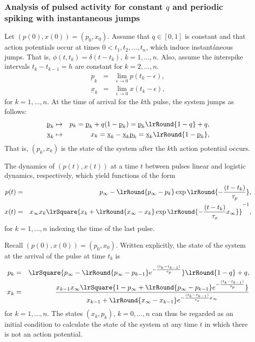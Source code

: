 \documentclass[8pt]{beamer}
\begin{document}
\begin{frame}
\frametitle{Analysis of pulsed activity for constant $q$ and periodic
  spiking with instantaneous jumps}

\begin{multicols}{2}
\begin{tiny}

  Let $(p(0),x(0))=(p_0,x_0)$.  Assume that $q \in [0,1]$ is constant
  and that action potentials occur at times $0<t_1, t_2,...,t_n$,
  which induce instantáneous jumps. That is, $\phi(t,t_k) =
  \delta(t-t_k)$, $k=1,...,n$.  Also, assume the interspike intervals
  $t_k - t_{k-1}=h$ are constant for $k=2,...,n$.
\begin{eqnarray}
\underbar{p}_k&=& \lim_{\epsilon\rightarrow 0} p(t_k-\epsilon), 
\\
\underbar{x}_k&=& \lim_{\epsilon\rightarrow 0} x(t_k-\epsilon),
\end{eqnarray}
for $k=1,...,n$. 
At the time of arrival for the $k$th pulse, the system jumps as follows:
\begin{eqnarray}
\underbar{p}_k& \mapsto & p_k= \underbar{p}_k + q (1-\underbar{p}_k) = \underbar{p}_k \lrRound{1-q} + q,
\\
\underbar{x}_k& \mapsto &
x_k
= \underbar{x}_k - \underbar{x}_k \underbar{p}_k 
= \underbar{x}_k \lrRound{1-\underbar{p}_k} ,
\end{eqnarray}
That is, $(p_k,x_k)$ is the state of the system after the $k$th
action potential occurs. 

The dynamics of $(p(t),x(t))$ at a time $t$ between pulses
linear and logistic dynamics, respectively, which yield functions of the form
\begin{eqnarray}
p(t) &=& p_{\infty} - \lrRound{p_{\infty}- p_k}
   \exp\lrRound{-\frac{(t-t_k)}{\tau_p}},
 \\
x(t) &=& x_{\infty} {x_k} \lrSquare{{x_k} + \lrRound{x_{\infty}- x_k}
\exp\lrRound{-\frac{(t-t_k)}{\tau_x}x_{\infty} }}^{-1},
\end{eqnarray}
for $k=1,...,n$ indexing the time of the last pulse.


Recall $(p(0),x(0))=(p_0,x_0)$. 
Written explicitly, the state of the system at
the arrival of the pulse at time $t_k$ is
\begin{eqnarray}
p_k &=& \lrSquare{p_{\infty} - \lrRound{p_{\infty}- p_{k-1}}
  e^{-\frac{(t_k-t_{k-1})}{\tau_p}}}\lrRound{1-q} + q,
\\
x_{k} &=& \frac
{{x_{k-1}} x_{\infty} \lrSquare{1-p_{\infty} + \lrRound{p_{\infty}- p_{k-1}}
  e^{-\frac{(t_k-t_{k-1})}{\tau_p}}}}
{ x_{k-1} + \lrRound{x_{\infty}- x_{k-1}} e^{-\frac{(t_k-t_{k-1})}{\tau_x}x_{\infty} }}
\end{eqnarray}
for $k=1,...,n$.  The states $(x_k,p_k)$, $k=0,...,n$ can thus be
regarded as an initial condition to  calculate the state of the system at any time $t$ in which there is
not an action potential. 

\end{tiny}
\end{multicols}
\end{frame}
\end{document}
